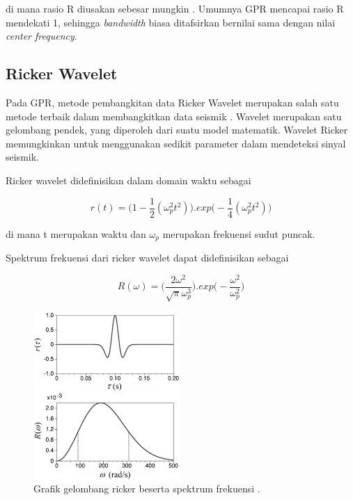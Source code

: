 di mana rasio R diusakan sebesar mungkin \parencite{jol2008ground}. 
Umumnya GPR mencapai rasio R mendekati 1, sehingga \emph{bandwidth} biasa ditafsirkan bernilai sama dengan nilai \emph{center frequency}.

\subsection{Ricker Wavelet}
\label{subsec:rickerWavelet}

Pada GPR, metode pembangkitan data Ricker Wavelet merupakan salah satu metode terbaik dalam membangkitkan data seismik \parencite{rickeronSeismic}. 
Wavelet merupakan satu gelombang pendek, yang diperoleh dari suatu model matematik. 
Wavelet Ricker memungkinkan untuk menggunakan sedikit parameter dalam mendeteksi sinyal seismik.

Ricker wavelet didefinisikan dalam domain waktu sebagai

\begin{equation}
  \label{eq:rickerTimeDomain}
  r(t) =  \big(1 -  \frac{1}{2} (  \omega _{p} ^{2}  t^{2} ) \big)  . exp \big(- \frac{1}{4} ( \omega _{p} ^{2}  t^{2} ) \big) 
\end{equation}

di mana t merupakan waktu dan $\omega_{p}$ merupakan frekuensi sudut puncak.

Spektrum frekuensi dari ricker wavelet dapat didefinisikan sebagai

\begin{equation}
  \label{eq:rickerTimeDomain}
  R( \omega ) =  \big( \frac{2 \omega ^{2}}{  \sqrt{ \pi }  \omega _{p} ^{3}} \big)  . exp \big(- \frac{ \omega ^{2}}{ \omega _{p} ^{2}} \big) 
\end{equation}

\begin{figure}[ht]
  \centering
  \includegraphics[scale=1]{gambar/ricker.jpg}
  \caption{Grafik gelombang ricker beserta spektrum frekuensi \parencite{rickerWavelet}.}
  \label{fig:gelombangRicker}
\end{figure}

